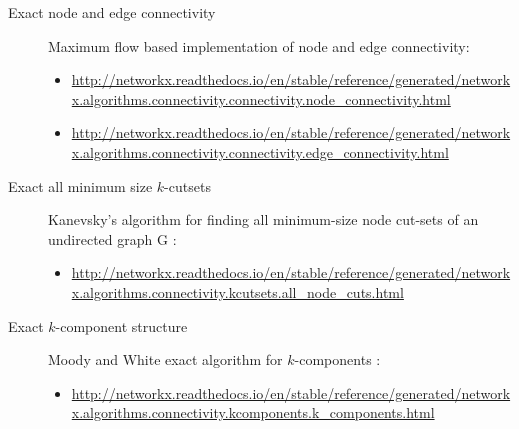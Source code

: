 \begin{description}

\item[Exact node and edge connectivity] Maximum flow based implementation of node and edge connectivity:

\begin{tiny} 
\begin{itemize} 

\item \href{http://networkx.readthedocs.io/en/stable/reference/generated/networkx.algorithms.connectivity.connectivity.node_connectivity.html}{http://networkx.readthedocs.io/en/stable/reference/generated/networkx.algorithms.connectivity.connectivity.node\_connectivity.html}

\item \href{http://networkx.readthedocs.io/en/stable/reference/generated/networkx.algorithms.connectivity.connectivity.edge_connectivity.html}{http://networkx.readthedocs.io/en/stable/reference/generated/networkx.algorithms.connectivity.connectivity.edge\_connectivity.html}

\end{itemize}
\end{tiny}

\item[Exact all minimum size $k$-cutsets]  Kanevsky's algorithm for finding all minimum-size node cut-sets of an undirected graph G \citep{kanevsky:1993}:

\begin{tiny} 
\begin{itemize} 

\item \href{http://networkx.readthedocs.io/en/stable/reference/generated/networkx.algorithms.connectivity.kcutsets.all_node_cuts.html}{http://networkx.readthedocs.io/en/stable/reference/generated/networkx.algorithms.connectivity.kcutsets.all\_node\_cuts.html}

\end{itemize}
\end{tiny}

\item[Exact $k$-component structure] Moody and White exact algorithm for $k$-components \citep{moody:2003}:

\begin{tiny} 
\begin{itemize}

\item \href{http://networkx.readthedocs.io/en/stable/reference/generated/networkx.algorithms.connectivity.kcomponents.k_components.html}{http://networkx.readthedocs.io/en/stable/reference/generated/networkx.algorithms.connectivity.kcomponents.k\_components.html}


\end{itemize}
\end{tiny}
\end{description}
